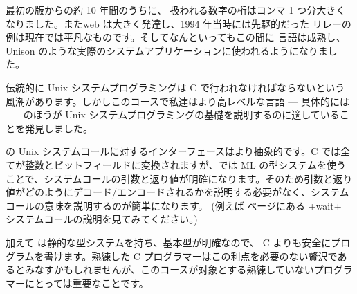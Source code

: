 最初の版からの約 10 年間のうちに、 扱われる数字の桁はコンマ 1 つ分大きくなりました。またweb は大きく発達し、1994 年当時には先駆的だった \http リレーの例は現在では平凡なものです。そしてなんといってもこの間に \ocaml 言語は成熟し、Unison \cite{Unison} のような実際のシステムアプリケーションに使われるようになりました。

伝統的に Unix システムプログラミングは C で行われなければならないという風潮があります。しかしこのコースで私達はより高レベルな言語 --- 具体的には \ocaml\ --- のほうが Unix システムプログラミングの基礎を説明するのに適していることを発見しました。

\ocaml の Unix システムコールに対するインターフェースはより抽象的です。C では全てが整数とビットフィールドに変換されますが、\ocaml では ML の型システムを使うことで、システムコールの引数と返り値が明確になります。そのため引数と返り値がどのようにデコード/エンコードされるかを説明する必要がなく、システムコールの意味を説明するのが簡単になります。 (例えば \pageref{wait} ページにある \ml+wait+ システムコールの説明を見てみてください。)

加えて \ocaml は静的な型システムを持ち、基本型が明確なので、 C よりも安全にプログラムを書けます。熟練した C プログラマーはこの利点を必要のない贅沢であるとみなすかもしれませんが、このコースが対象とする熟練していないプログラマーにとっては重要なことです。

